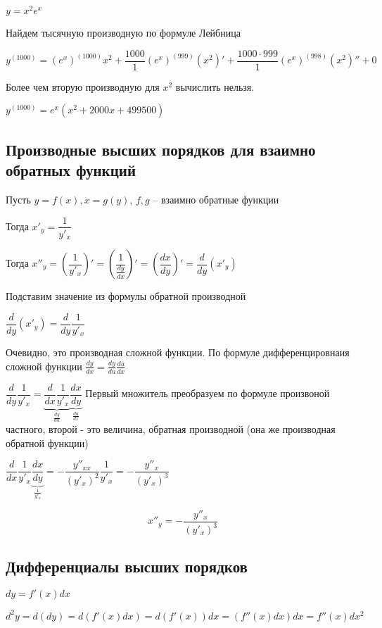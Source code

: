 $ y = x^{2} e^{x} $

Найдем тысячную производную по формуле Лейбница

$ y^{(1000)} = 
(e^{x})^{(1000)} x^{2} +
\dfrac{1000}{1} (e^{x})^{(999)} (x^{2})' +
\dfrac{1000 \cdot 999}{1} (e^{x})^{(998)} (x^{2})'' + 0
$

Более чем вторую производную для $ x^{2} $ вычислить нельзя.

$ y^{(1000)} = 
e^{x} (x^{2} + 2000 x + 499500) $

\subsection{Производные высших порядков для взаимно обратных функций}

Пусть $ y = f(x), x = g(y) $, $ f,g $ -- взаимно обратные функции

Тогда $ x'_{y} = \dfrac{1}{y'_{x}} $

Тогда $ x''_{y} = 
\left(
\dfrac{1}{y'_{x}}
\right)'
=
\left(
\dfrac{1}{ \frac{dy}{dx} }
\right)'
=
\left(
\dfrac{dx}{dy}
\right)'
=
\dfrac{d}{dy} (x'_y)
$

Подставим значение из формулы обратной производной

$
\dfrac{d}{dy} (x'_y)=
\dfrac{d}{dy} 
\dfrac{1}{y'_{x}}
$

Очевидно, это производная сложной функции. По формуле дифференцировнаия сложной функции 
$ \frac{dy}{dx} = \frac{dy}{du}\frac{du}{dx} $

$
\dfrac{d}{dy} 
\dfrac{1}{y'_{x}}
=
\underbrace{
\dfrac{d}{dx}
\dfrac{1}{y'_{x}}
}_{\frac{dy}{du}}
\underbrace{
\dfrac{dx}{dy}
}_{\frac{du}{dx}}
$
Первый множитель преобразуем по формуле произвоной частного, второй - это величина, обратная производной
(она же производная обратной функции)

$
\dfrac{d}{dx}
\dfrac{1}{y'_{x}}
\underbrace{
\dfrac{dx}{dy}
}_{\frac{1}{y'_x}}
= -\dfrac{y''_{xx}}{(y'_{x})^{2}}
\dfrac{1}{y'_{x}}
=
- \dfrac{y''_{x}}{(y'_{x})^{3}}
$

$$
x''_{y} = - \dfrac{y''_{x}}{(y'_{x})^{3}} \label{diff1}
$$


\subsection{Дифференциалы высших порядков}

$ dy = f'(x)dx $

$ d^{2}y = d(dy) = d(f'(x)dx) = d(f'(x)) dx = (f''(x) dx) dx = f''(x) dx^{2} $

